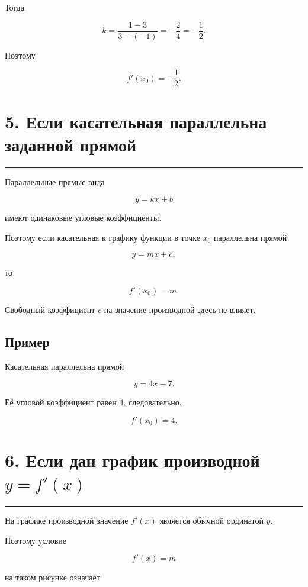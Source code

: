 \documentclass[a4paper,12pt]{article}
\newcommand{\topicrule}{%
  \par\noindent
  {\color{accent}\rule{\linewidth}{0.55pt}}
  \par
}
\begin{document}
Тогда

\[
k=
\frac{1-3}{3-(-1)}
=
-\frac24
=
-\frac12.
\]

Поэтому

\[
\boxed{
f'(x_0)=-\frac12
}.
\]


\section*{\color{darkaccent}5. Если касательная параллельна заданной прямой}
\topicrule

Параллельные прямые вида

\[
y=kx+b
\]

имеют одинаковые угловые коэффициенты.

Поэтому если касательная к графику функции в точке \(x_0\)
параллельна прямой

\[
y=mx+c,
\]

то

\[
\boxed{
f'(x_0)=m
}.
\]

Свободный коэффициент \(c\) на значение производной здесь не влияет.

\subsection*{Пример}

Касательная параллельна прямой

\[
y=4x-7.
\]

Её угловой коэффициент равен \(4\), следовательно,

\[
\boxed{
f'(x_0)=4
}.
\]


\section*{\color{darkaccent}6. Если дан график производной \(y=f'(x)\)}
\topicrule

На графике производной значение \(f'(x)\) является обычной ординатой \(y\).

Поэтому условие

\[
f'(x)=m
\]

на таком рисунке означает
\end{document}
